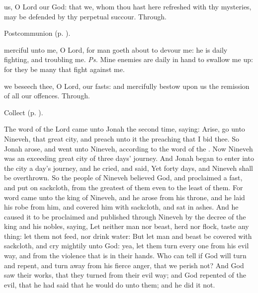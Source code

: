 \postcommunion
{} us, O Lord our God: that we, whom thou hast here refreshed with thy mysteries, may be defended by thy perpetual succour. Through.


\begin{rubric}
     Postcommunion  (p. \pageref{AshWednesdayMassPostcommunion}).
\end{rubric}


\introit
{} merciful unto me, O Lord, for man goeth about to devour me: he is daily fighting, and troubling me. \textit{Ps.} Mine enemies are daily in hand to swallow me up: for they be many that fight against me.

\collect
{} we beseech thee, O Lord, our fasts: and mercifully bestow upon us the remission of all our offences. Through.


\begin{rubric}
     Collect  (p. \pageref{AshWednesdayMassCollect}).
\end{rubric}


 The word of the Lord came unto Jonah the second time, saying: Arise, go unto Nineveh, that great city, and preach unto it the preaching that I bid thee. So Jonah arose, and went unto Nineveh, according to the word of the . Now Nineveh was an exceeding great city of three days' journey. And Jonah began to enter into the city a day's journey, and he cried, and said, Yet forty days, and Nineveh shall be overthrown. So the people of Nineveh believed God, and proclaimed a fast, and put on sackcloth, from the greatest of them even to the least of them. For word came unto the king of Nineveh, and he arose from his throne, and he laid his robe from him, and covered him with sackcloth, and sat in ashes. And he caused it to be proclaimed and published through Nineveh by the decree of the king and his nobles, saying, Let neither man nor beast, herd nor flock, taste any thing: let them not feed, nor drink water: But let man and beast be covered with sackcloth, and cry mightily unto God: yea, let them turn every one from his evil way, and from the violence that is in their hands. Who can tell if God will turn and repent, and turn away from his fierce anger, that we perish not? And God saw their works, that they turned from their evil way; and God repented of the evil, that he had said that he would do unto them; and he did it not.

